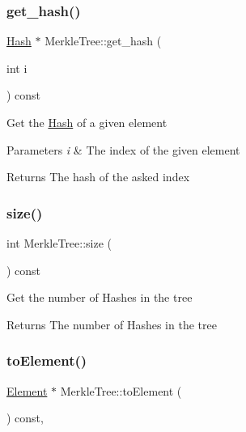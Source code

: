 \subsubsection{\texorpdfstring{get\+\_\+hash()}{get\_hash()}}
{\footnotesize\ttfamily \mbox{\hyperlink{classHash}{Hash}} $\ast$ Merkle\+Tree\+::get\+\_\+hash (\begin{DoxyParamCaption}\item[{int}]{i }\end{DoxyParamCaption}) const}

Get the \mbox{\hyperlink{classHash}{Hash}} of a given element


\begin{DoxyParams}{Parameters}
{\em i} & The index of the given element \\
\hline
\end{DoxyParams}
\begin{DoxyReturn}{Returns}
The hash of the asked index 
\end{DoxyReturn}
\mbox{\label{classMerkleTree_aac309360fa4653451af713a8ce9684bd}} 
\subsubsection{\texorpdfstring{size()}{size()}}
{\footnotesize\ttfamily int Merkle\+Tree\+::size (\begin{DoxyParamCaption}{ }\end{DoxyParamCaption}) const}

Get the number of Hashes in the tree

\begin{DoxyReturn}{Returns}
The number of Hashes in the tree 
\end{DoxyReturn}
\mbox{\label{classMerkleTree_a4e72819c6cbc49ed8ce092f464711a5f}} 
\subsubsection{\texorpdfstring{to\+Element()}{toElement()}}
{\footnotesize\ttfamily \mbox{\hyperlink{classElement}{Element}} $\ast$ Merkle\+Tree\+::to\+Element (\begin{DoxyParamCaption}{ }\end{DoxyParamCaption}) const\hspace{0.3cm}{\ttfamily [override]}, {\ttfamily [virtual]}}

